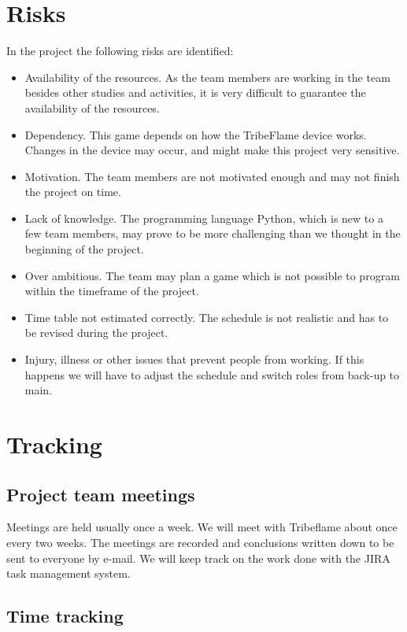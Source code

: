 \documentclass[12pt,a4paper]{article}
\begin{document}
\section{Risks}

In the project the following risks are identified:

\begin{itemize}
\item Availability of the resources. As the team members are working in the team besides other studies and activities, it is very difficult to guarantee the availability of the resources.
\item Dependency. This game depends on how the TribeFlame device works. Changes in the device may occur, and might make this project very sensitive.
\item Motivation. The team members are not motivated enough and may not finish the project on time.
\item Lack of knowledge. The programming language Python, which is new to a few team members, may prove to be more challenging than we thought in the beginning of the project.
\item Over ambitious. The team may plan a game which is not possible to program within the timeframe of the project.
\item Time table not estimated correctly. The schedule is not realistic and has to be revised during the project.
\item Injury, illness or other issues that prevent people from working. If this happens we will have to adjust the schedule and switch roles from back-up to main.
\end{itemize}

\section{Tracking}

\subsection{Project team meetings}

Meetings are held usually once a week. We will meet with Tribeflame
about once every two weeks. The meetings are recorded and conclusions
written down to be sent to everyone by e-mail.  We will keep track on
the work done with the JIRA task management system.

\subsection{Time tracking}
\end{document}
